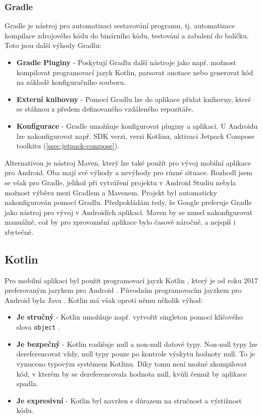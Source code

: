 \subsubsection *{Gradle}
Gradle je nástroj pro automatizaci sestavování programu, tj. automatizace kompilace zdrojového kódu do binárního kódu, testování a zabalení do balíčku. Toto jsou další výhody Gradlu: 

\begin{itemize}
	\item \textbf{Gradle Pluginy} - Poskytují Gradlu další nástroje jako např. možnost kompilovat programovací jazyk Kotlin, parsovat anotace nebo generovat kód na základě konfiguračního souboru. 
	
	\item \textbf{Externí knihovny} - Pomocí Gradlu lze do aplikace přidat knihovny, které se stáhnou \linebreak z předem definovaného vzdáleného repozitáře.
	
	\item \textbf{Konfigurace} - Gradle umožňuje konfigurovat pluginy a aplikaci. U Androidu lze nakonfigurovat např. SDK verzi, verzi Kotlinu, aktivaci Jetpack Compose toolkitu (\ref{ssec:jetpack-compose}).
\end{itemize}

\noindent Alternativou je nástroj Maven, který lze také použít pro vývoj mobilní aplikace pro Android. Oba mají své výhody a nevýhody pro různé situace. Rozhodl jsem se však pro Gradle, jelikož při vytváření projektu v Android Studiu nebyla možnost výběru mezi Gradlem a Mavenem. Projekt byl automaticky nakonfigurován pomocí Gradlu. Předpokládám tedy, že Google preferuje Gradle jako nástroj pro vývoj v Androidích aplikací. Maven by se musel nakonfigurovat manuálně, což by pro zprovoznění aplikace bylo časově náročné, a nejspíš i zbytečné.

\subsection *{Kotlin}
Pro mobilní aplikaci byl použit programovací jayzk Kotlin \cite{kotlin}, který je od roku 2017 preferovaným jazykem pro Android \cite{google-prefers-kotlin}. Původním programovacím jayzkem pro Android byla Java \cite{java}. Kotlin má však oproti němu několik výhod:

\begin{itemize}
    \item \textbf{Je stručný} - Kotlin umožňuje např. vytvořit 
    singleton pomocí klíčového slova \lstinline{object} \cite{kotlin-object}.
    
    \item \textbf{Je bezpečný} - Kotlin rozlišuje null a non-null datové typy. Non-null typy lze dereferencovat vždy, null typy pouze po kontrole výskytu hodnoty null. To je vynuceno typovým systémem Kotlinu. Díky tomu není možné zkompilovat kód, v kterém by se dereferencovala hodnota null, kvůli čemuž by aplikace spadla.
    
    \item \textbf{Je expresivní} - Kotlin byl navržen s důrazem na stručnost a výstižnost kódu.
\end{itemize}

